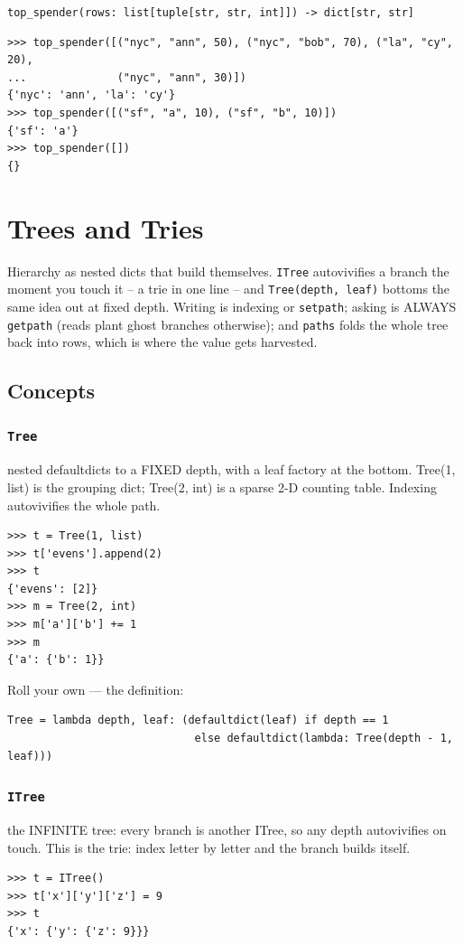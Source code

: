 \documentclass[10pt,letterpaper]{book}
\begin{document}
\noindent\texttt{top\_spender(rows: list[tuple[str, str, int]]) -> dict[str, str]}
\begin{lstlisting}[style=ex]
>>> top_spender([("nyc", "ann", 50), ("nyc", "bob", 70), ("la", "cy", 20),
...              ("nyc", "ann", 30)])
{'nyc': 'ann', 'la': 'cy'}
>>> top_spender([("sf", "a", 10), ("sf", "b", 10)])
{'sf': 'a'}
>>> top_spender([])
{}
\end{lstlisting}
\clearpage
\chapter{Trees and Tries}

Hierarchy as nested dicts that build themselves. \texttt{ITree} autovivifies
a branch the moment you touch it -- a trie in one line -- and
\texttt{Tree(depth, leaf)} bottoms the same idea out at fixed depth.
Writing is indexing or \texttt{setpath}; asking is ALWAYS \texttt{getpath}
(reads plant ghost branches otherwise); and \texttt{paths} folds the whole
tree back into rows, which is where the value gets harvested.
\section{Concepts}
\subsection{\texttt{Tree}}\label{def:Tree}
nested defaultdicts to a FIXED depth, with a leaf factory at the bottom. Tree(1, list) is the grouping dict; Tree(2, int) is a sparse 2-D counting table. Indexing autovivifies the whole path.
\begin{lstlisting}[style=ex]
>>> t = Tree(1, list)
>>> t['evens'].append(2)
>>> t
{'evens': [2]}
>>> m = Tree(2, int)
>>> m['a']['b'] += 1
>>> m
{'a': {'b': 1}}
\end{lstlisting}

Roll your own --- the definition:

\begin{lstlisting}[style=ex]
Tree = lambda depth, leaf: (defaultdict(leaf) if depth == 1
                             else defaultdict(lambda: Tree(depth - 1, leaf)))
\end{lstlisting}
\subsection{\texttt{ITree}}\label{def:ITree}
the INFINITE tree: every branch is another ITree, so any depth autovivifies on touch. This is the trie: index letter by letter and the branch builds itself.
\begin{lstlisting}[style=ex]
>>> t = ITree()
>>> t['x']['y']['z'] = 9
>>> t
{'x': {'y': {'z': 9}}}
\end{lstlisting}
\end{document}
